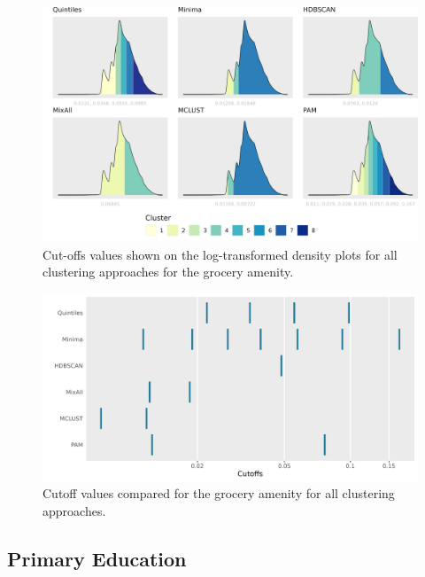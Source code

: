 \documentclass[11pt, a4paper]{article}
\begin{document}
\begin{figure}[H]
\centering
\includegraphics[width=\textwidth]{./cutoffs/by_amenity/Grocery_cutoffs.png}
\caption[Grocery cutoffs]{Cut-offs values shown on the log-transformed density plots for all clustering approaches for the grocery amenity.}\label{grocerycutoffs}
\end{figure}




\begin{figure}[H]
\centering
\includegraphics[width=\textwidth]{./cutoff_ticks/Grocery_ticks.png}
\caption[Grocery cutoff comparison]{Cutoff values compared for the grocery amenity for all clustering approaches.}\label{groceryticks}
\end{figure}









\justifying
\subsection{Primary Education}
\end{document}
